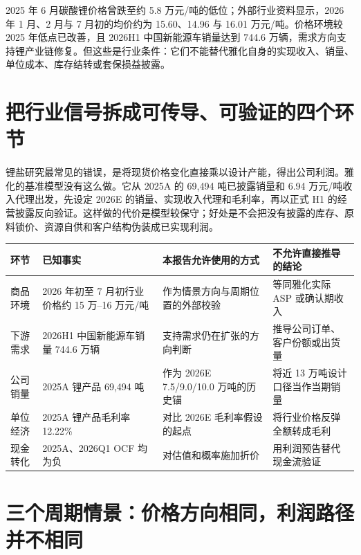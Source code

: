 \begin{houseviewbox}
2025 年 6 月碳酸锂价格曾跌至约 5.8 万元/吨的低位；外部行业资料显示，2026 年 1 月、2 月与 7 月初的均价约为 15.60、14.96 与 16.01 万元/吨。价格环境较 2025 年低点已改善，且 2026H1 中国新能源车销量达到 744.6 万辆，需求方向支持锂产业链修复。但这些是行业条件：它们不能替代雅化自身的实现收入、销量、单位成本、库存结转或套保损益披露。
\end{houseviewbox}

\section{把行业信号拆成可传导、可验证的四个环节}

锂盐研究最常见的错误，是将现货价格变化直接乘以设计产能，得出公司利润。雅化的基准模型没有这么做。它从 2025A 的 69,494 吨已披露销量和 6.94 万元/吨收入代理出发，先设定 2026E 的销量、实现收入代理和毛利率，再以正式 H1 的经营披露反向验证。这样做的代价是模型较保守；好处是不会把没有披露的库存、原料锁价、资源自供和客户结构伪装成已实现利润。

\begin{exhibitbox}
\begin{tabularx}{\exhibitboxwidth}{L{2.5cm}L{2.7cm}X X}
\toprule
环节 & 已知事实 & 本报告允许使用的方式 & 不允许直接推导的结论 \\
\midrule
商品环境 & 2026 年初至 7 月初行业价格约 15 万--16 万元/吨 & 作为情景方向与周期位置的外部校验 & 等同雅化实际 ASP 或确认期收入 \\
下游需求 & 2026H1 中国新能源车销量 744.6 万辆 & 支持需求仍在扩张的方向判断 & 推导公司订单、客户份额或出货量 \\
公司销量 & 2025A 锂产品 69,494 吨 & 作为 2026E 7.5/9.0/10.0 万吨的历史锚 & 将近 13 万吨设计口径当作当期销量 \\
单位经济 & 2025A 锂产品毛利率 12.22\% & 对比 2026E 毛利率假设的起点 & 将行业价格反弹全额转成毛利 \\
现金转化 & 2025A、2026Q1 OCF 均为负 & 对估值和概率施加折价 & 用利润预告替代现金流验证 \\
\bottomrule
\end{tabularx}
\end{exhibitbox}

\section{三个周期情景：价格方向相同，利润路径并不相同}

